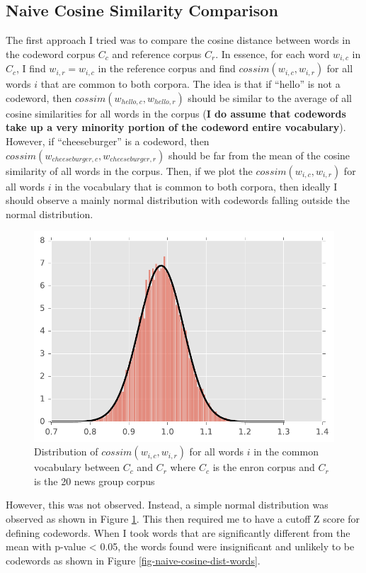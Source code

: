 \subsection{Naive Cosine Similarity Comparison}

The first approach I tried was to compare the cosine distance between words in the codeword corpus $C_c$ and reference corpus $C_r$. In essence, for each word $w_{i, c}$ in $C_c$, I find $w_{i, r} = w_{i, c}$ in the reference corpus and find $cossim(w_{i, c}, w_{i, r})$ for all words $i$ that are common to both corpora. The idea is that if ``hello'' is not a codeword, then $cossim(w_{hello, c}, w_{hello, r})$ should be similar to the average of all cosine similarities for all words in the corpus (\textbf{I do assume that codewords take up a very minority portion of the codeword entire vocabulary}). However, if ``cheeseburger'' is a codeword, then $cossim(w_{cheeseburger, c}, w_{cheeseburger, r})$ should be far from the mean of the cosine similarity of all words in the corpus. Then, if we plot the $cossim(w_{i, c}, w_{i, r})$ for all words $i$ in the vocabulary that is common to both corpora, then ideally I should observe a mainly normal distribution with codewords falling outside the normal distribution.

\begin{figure}[H]
\centering
\includegraphics[width=.5\textwidth]{figures/naive-cosine-dist.pdf}
\caption{Distribution of $cossim(w_{i, c}, w_{i, r})$ for all words $i$ in the common vocabulary between $C_c$ and $C_r$ where $C_c$ is the enron corpus and $C_r$ is the 20 news group corpus}
\label{fig-naive-cosine-dist}
\end{figure}

However, this was not observed. Instead, a simple normal distribution was observed as shown in Figure \ref{fig-naive-cosine-dist}. This then required me to have a cutoff Z score for defining codewords. When I took words that are significantly different from the mean with p-value < 0.05, the words found were insignificant and unlikely to be codewords as shown in Figure \ref{fig-naive-cosine-dist-words}.

